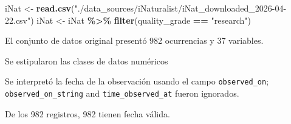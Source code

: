 \documentclass[sn-apa,pdflatex]{sn-jnl}
\newenvironment{Shaded}{\begin{snugshade}}{\end{snugshade}}
\newcommand{\FunctionTok}[1]{\textcolor[rgb]{0.13,0.29,0.53}{\textbf{#1}}}
\newcommand{\NormalTok}[1]{#1}
\newcommand{\OtherTok}[1]{\textcolor[rgb]{0.56,0.35,0.01}{#1}}
\newcommand{\SpecialCharTok}[1]{\textcolor[rgb]{0.81,0.36,0.00}{\textbf{#1}}}
\newcommand{\StringTok}[1]{\textcolor[rgb]{0.31,0.60,0.02}{#1}}
\begin{document}
\begin{Shaded}
\begin{Highlighting}[]
\NormalTok{iNat }\OtherTok{\textless{}{-}} \FunctionTok{read.csv}\NormalTok{(}\StringTok{"./data\_sources/iNaturalist/iNat\_downloaded\_2026{-}04{-}22.csv"}\NormalTok{)}
\NormalTok{iNat }\OtherTok{\textless{}{-}}\NormalTok{ iNat }\SpecialCharTok{\%\textgreater{}\%}
    \FunctionTok{filter}\NormalTok{(quality\_grade }\SpecialCharTok{==} \StringTok{"research"}\NormalTok{)}
\end{Highlighting}
\end{Shaded}

El conjunto de datos original presentó 982 ocurrencias y 37 variables.

Se estipularon las clases de datos numéricos

\begin{Shaded}
\end{Shaded}

Se interpretó la fecha de la observación usando el campo
\texttt{observed\_on}; \texttt{observed\_on\_string} and
\texttt{time\_observed\_at} fueron ignorados.

\begin{Shaded}
\end{Shaded}

De los 982 registros, 982 tienen fecha válida.

\begin{Shaded}
\end{Shaded}
\end{document}
